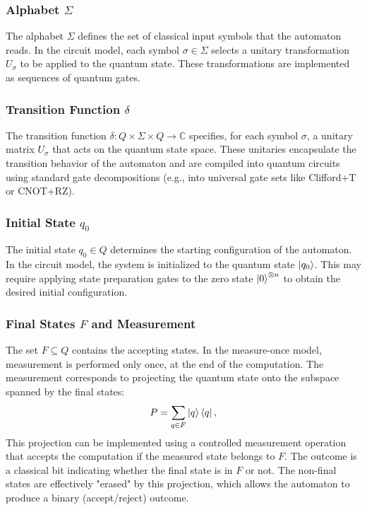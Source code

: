 \subsubsection{Alphabet $\Sigma$}

The alphabet $\Sigma$ defines the set of classical input symbols that the automaton reads. In the circuit model, each symbol $\sigma \in \Sigma$ selects a unitary transformation $U_\sigma$ to be applied to the quantum state. These transformations are implemented as sequences of quantum gates.

\subsubsection{Transition Function $\delta$}

The transition function $\delta: Q \times \Sigma \times Q \to \mathbb{C}$ specifies, for each symbol $\sigma$, a unitary matrix $U_\sigma$ that acts on the quantum state space. These unitaries encapsulate the transition behavior of the automaton and are compiled into quantum circuits using standard gate decompositions (e.g., into universal gate sets like Clifford+T or CNOT+RZ).

\subsubsection{Initial State $q_0$}

The initial state $q_0 \in Q$ determines the starting configuration of the automaton. In the circuit model, the system is initialized to the quantum state $\ket{q_0}$. This may require applying state preparation gates to the zero state $\ket{0}^{\otimes n}$ to obtain the desired initial configuration.

\subsubsection{Final States $F$ and Measurement}

The set $F \subseteq Q$ contains the accepting states. In the measure-once model, measurement is performed only once, at the end of the computation. The measurement corresponds to projecting the quantum state onto the subspace spanned by the final states:
\[
P=\sum_{q\in F} \ket{q}\bra{q},
\]
This projection can be implemented using a controlled measurement operation that accepts the computation if the measured state belongs to $F$. The outcome is a classical bit indicating whether the final state is in $F$ or not. The non-final states are effectively "erased" by this projection, which allows the automaton to produce a binary (accept/reject) outcome.

